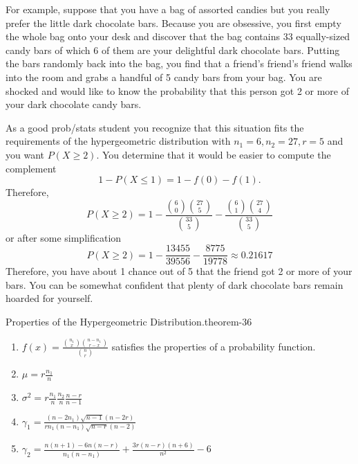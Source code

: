 \documentclass[10pt,]{book}
\numberwithin{equation}{section}
\begin{document}
%
\par
\hypertarget{p-833}{}%
For example, suppose that you have a bag of assorted candies but you really prefer the little dark chocolate bars. Because you are obsessive, you first empty the whole bag onto your desk and discover that the bag contains 33 equally-sized candy bars of which 6 of them are your delightful dark chocolate bars. Putting the bars randomly back into the bag, you find that a friend's friend's friend walks into the room and grabs a handful of 5 candy bars from your bag. You are shocked and would like to know the probability that this person got 2 or more of your dark chocolate candy bars.%
\par
\hypertarget{p-834}{}%
As a good prob/stats student you recognize that this situation fits the requirements of the hypergeometric distribution with \(n_1 = 6, n_2 = 27, r=5\) and you want \(P(X \ge 2)\).  You determine that it would be easier to compute the complement%
\begin{equation*}
1 - P(X \le 1) = 1 - f(0) - f(1).
\end{equation*}
Therefore,%
\begin{equation*}
P (X \ge 2) = 1 - \frac{\binom{6}{0} \binom{27}{5}}{\binom{33}{5}} - \frac{\binom{6}{1} \binom{27}{4}}{\binom{33}{5}}
\end{equation*}
or after some simplification%
\begin{equation*}
P (X \ge 2) = 1 - \frac{13455}{39556} - \frac{8775}{19778} \approx 0.21617
\end{equation*}
Therefore, you have about 1 chance out of 5 that the friend got 2 or more of your bars. You can be somewhat confident that plenty of dark chocolate bars remain hoarded for yourself.%
\par
\hypertarget{p-835}{}%
\begin{theorem}{Properties of the Hypergeometric Distribution.}{}{theorem-36}%
\hypertarget{HypergeometricProperties}{}%
\leavevmode%
\begin{enumerate}
\item\hypertarget{li-218}{}\(f(x) = \frac{\binom{n_1}{x} \binom{n-n_1}{r-x}}{\binom{n}{r}}\) satisfies the properties of a probability function.%
\item\hypertarget{li-219}{}\(\mu = r \frac{n_1}{n}\)%
\item\hypertarget{li-220}{}\(\sigma^2 = r \frac{n_1}{n} \frac{n_2}{n} \frac{n-r}{n-1}\)%
\item\hypertarget{li-221}{}\(\gamma_1 = \frac{(n - 2 n_1)\sqrt{n-1}(n - 2r)}{r n_1 (n - n_1) \sqrt{n-r}(n-2)}\)%
\item\hypertarget{li-222}{}\(\gamma_2 = \frac{n(n+1)-6n(n-r)}{n_1(n-n_1)} + \frac{3r(n-r)(n+6)}{n^2} - 6\)%
\end{enumerate}
%
\end{theorem}
\end{document}
